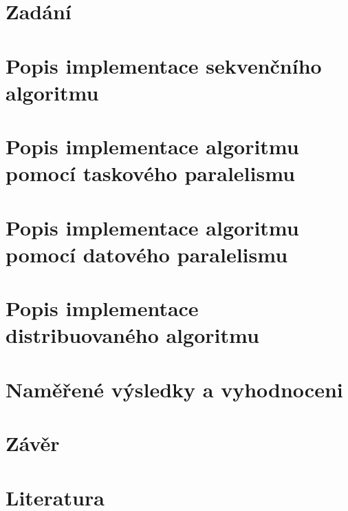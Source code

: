 

\section{Zadání}


\section{Popis implementace sekvenčního algoritmu}


\section{Popis implementace algoritmu pomocí taskového paralelismu}


\section{Popis implementace algoritmu pomocí datového paralelismu}


\section{Popis implementace distribuovaného algoritmu}


\section{Naměřené výsledky a vyhodnoceni}


\section{Závěr}


\section{Literatura}



